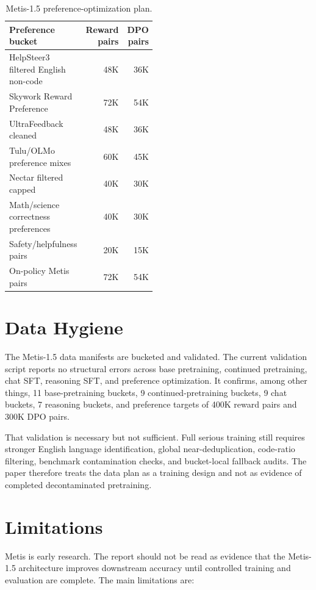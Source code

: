 \documentclass[11pt]{article}
\begin{document}
\begin{table}[h]
\centering
\begin{tabular}{p{0.48\linewidth}r r}
\toprule
Preference bucket & Reward pairs & DPO pairs \\
\midrule
HelpSteer3 filtered English non-code & 48K & 36K \\
Skywork Reward Preference & 72K & 54K \\
UltraFeedback cleaned & 48K & 36K \\
Tulu/OLMo preference mixes & 60K & 45K \\
Nectar filtered capped & 40K & 30K \\
Math/science correctness preferences & 40K & 30K \\
Safety/helpfulness pairs & 20K & 15K \\
On-policy Metis pairs & 72K & 54K \\
\bottomrule
\end{tabular}
\caption{Metis-1.5 preference-optimization plan.}
\label{tab:preference}
\end{table}

\section{Data Hygiene}

The Metis-1.5 data manifests are bucketed and validated. The current validation
script reports no structural errors across base pretraining, continued
pretraining, chat SFT, reasoning SFT, and preference optimization. It confirms,
among other things, 11 base-pretraining buckets, 9 continued-pretraining buckets,
9 chat buckets, 7 reasoning buckets, and preference targets of 400K reward pairs
and 300K DPO pairs.

That validation is necessary but not sufficient. Full serious training still
requires stronger English language identification, global near-deduplication,
code-ratio filtering, benchmark contamination checks, and bucket-local fallback
audits. The paper therefore treats the data plan as a training design and not as
evidence of completed decontaminated pretraining.

\section{Limitations}

Metis is early research. The report should not be read as evidence that the
Metis-1.5 architecture improves downstream accuracy until controlled training
and evaluation are complete. The main limitations are:
\end{document}
